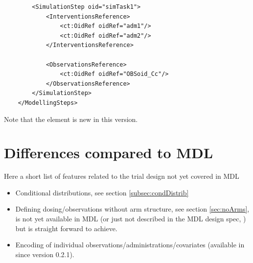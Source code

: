 \begin{example}
\begin{lstlisting}
        <SimulationStep oid="simTask1">
            <InterventionsReference>
                <ct:OidRef oidRef="adm1"/>
                <ct:OidRef oidRef="adm2"/>
            </InterventionsReference>
            
            <ObservationsReference>
                <ct:OidRef oidRef="OBSoid_Cc"/>
            </ObservationsReference>
        </SimulationStep>
    </ModellingSteps>
\end{lstlisting}
Note that the  element is new in this version.
\end{example}


\section{Differences compared to MDL}
Here a short list of features related to the trial design not yet covered in MDL
\begin{itemize}
\item 
Conditional distributions, see section \ref{subsec:condDistrib}
\item 
Defining dosing/observations without arm structure, see section \ref{sec:noArms},
is not yet available in MDL (or just not described in the MDL design spec,
\cite{Commets2015} ) but is straight forward to achieve.
\item 
Encoding of individual observations/administrations/covariates (available in \pml since 
version 0.2.1).\
\end{itemize}


%
%

